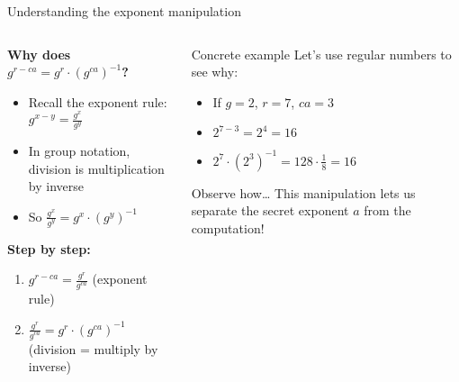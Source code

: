\documentclass[aspectratio=169, lualatex, handout]{beamer}
\begin{document}
\begin{frame}{Understanding the exponent manipulation}
	\begin{columns}[c]
		\begin{column}{0.5\textwidth}
			\textbf{Why does $g^{r-ca} = g^r \cdot (g^{ca})^{-1}$?}
			\begin{itemize}
				\item Recall the exponent rule: $g^{x-y} = \frac{g^x}{g^y}$
				\item In group notation, division is multiplication by inverse
				\item So $\frac{g^x}{g^y} = g^x \cdot (g^y)^{-1}$
			\end{itemize}
			\textbf{Step by step:}
			\begin{enumerate}
				\item $g^{r-ca} = \frac{g^r}{g^{ca}}$ (exponent rule)
				\item $\frac{g^r}{g^{ca}} = g^r \cdot (g^{ca})^{-1}$ (division = multiply by inverse)
			\end{enumerate}
		\end{column}
		\begin{column}{0.5\textwidth}
			\begin{exampleblock}{Concrete example}
				Let's use regular numbers to see why:
				\begin{itemize}
					\item If $g = 2$, $r = 7$, $ca = 3$
					\item $2^{7-3} = 2^4 = 16$
					\item $2^7 \cdot (2^3)^{-1} = 128 \cdot \frac{1}{8} = 16$ \mycheckmark
				\end{itemize}
			\end{exampleblock}
			\vspace{0.5em}
			\begin{alertblock}{Observe how\ldots}
				This manipulation lets us separate the secret exponent $a$ from the computation!
			\end{alertblock}
		\end{column}
	\end{columns}
\end{frame}
\end{document}
